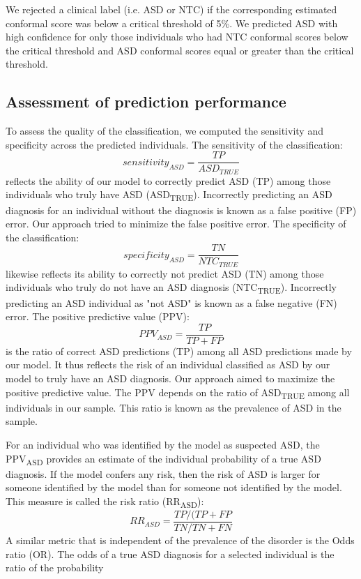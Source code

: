 \documentclass[9pt,lineno]{elife}
\begin{document}
We rejected a clinical label (i.e. ASD or NTC) if the corresponding estimated conformal score was below a critical threshold of 5\%. We predicted ASD with high confidence for only those individuals who had NTC conformal scores below the critical threshold and ASD conformal scores equal or greater than the critical threshold.


\subsection{Assessment of prediction performance}
To assess the quality of the classification, we computed the sensitivity and specificity across the predicted individuals. The sensitivity of the classification:
\begin{equation}
\label{eq:sens_ASD}
sensitivity_{ASD} = \frac{TP}{ASD_{TRUE}}
\end{equation}
reflects the ability of our model to correctly predict ASD (TP) among those individuals who truly have ASD (ASD\textsubscript{TRUE}). Incorrectly predicting an ASD diagnosis for an individual without the diagnosis is known as a false positive (FP) error. Our approach tried to minimize the false positive error. The specificity of the classification: 
\begin{equation}
\label{eq:spec_ASD}
specificity_{ASD} = \frac{TN}{NTC_{TRUE}}
\end{equation}
likewise reflects its ability to correctly not predict ASD (TN) among those individuals who truly do not have an ASD diagnosis (NTC\textsubscript{TRUE}). Incorrectly predicting an ASD individual as "not ASD" is known as a false negative (FN) error. The positive predictive value (PPV):
\begin{equation}
\label{eq:ppv_ASD}
PPV_{ASD} = \frac{TP}{TP+FP}
\end{equation}
is the ratio of correct ASD predictions (TP) among all ASD predictions made by our model. It thus reflects the risk of an individual classified as ASD by our model to truly have an ASD diagnosis. Our approach aimed to maximize the positive predictive value. The PPV depends on the ratio of ASD\textsubscript{TRUE} among all individuals in our sample. This ratio is known as the prevalence of ASD in the sample. 

For an individual who was identified by the model as suspected ASD, the PPV\textsubscript{ASD} provides an estimate of the individual probability of a true ASD diagnosis. If the model confers any risk, then the risk of ASD is larger for someone identified by the model than for someone not identified by the model. This measure is called the risk ratio (RR\textsubscript{ASD}):
\begin{equation}
\label{eq:risk_ratio}
RR_{ASD} = \frac{TP/(TP+FP}{TN/TN+FN}
\end{equation}
A similar metric that is independent of the prevalence of the disorder is the Odds ratio (OR). The odds of a true ASD diagnosis for a selected individual is the ratio of the probability
\end{document}
